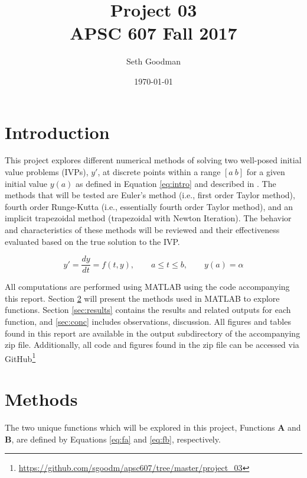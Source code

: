 \documentclass{article}
\title{
	Project 03 \\
	\bigskip
	\normalsize APSC 607 Fall 2017
}
\author{Seth Goodman}
\date{\today}
\begin{document}
\maketitle



\section{Introduction}
\label{sec:introduction}

This project explores different numerical methods of solving two well-posed initial value problems (IVPs), $y'$, at discrete points within a range $[a\ b]$ for a given initial value $y(a)$ as defined in Equation \ref{eq:intro} and described in \cite{burden2010}. The methods that will be tested are Euler's method (i.e., first order Taylor method), fourth order Runge-Kutta (i.e., essentially fourth order Taylor method), and an implicit trapezoidal method (trapezoidal with Newton Iteration). The behavior and characteristics of these methods will be reviewed and their effectiveness evaluated based on the true solution to the IVP.

\begin{equation}
y' = \frac{dy}{dt} = f(t,y), \qquad a \leq t \leq b, \qquad  y(a) = \alpha
\label{eq:intro}
\end{equation}

All computations are performed using MATLAB using the code accompanying this report. Section \ref{sec:methods} will present the methods used in MATLAB to explore functions. Section \ref{sec:results} contains the results and related outputs for each function, and \ref{sec:conc} includes observations, discussion. All figures and tables found in this report are available in the output subdirectory of the accompanying zip file. Additionally, all code and figures found in the zip file can be accessed via GitHub\footnote{\url{https://github.com/sgoodm/apsc607/tree/master/project_03}}

\newpage
\section{Methods}
\label{sec:methods}

The two unique functions which will be explored in this project, Functions \textbf{A} and \textbf{B}, are defined by Equations \ref{eq:fa} and \ref{eq:fb}, respectively.
\end{document}
